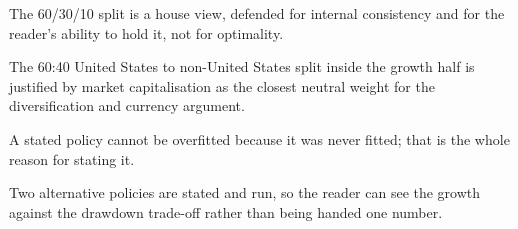 \begin{keytakeaways}
\item The 60/30/10 split is a house view, defended for internal
consistency and for the reader's ability to hold it, not for optimality.
\item The 60:40 United States to non-United States split inside the growth
half is justified by market capitalisation as the closest neutral weight
for the diversification and currency argument.
\item A stated policy cannot be overfitted because it was never fitted;
that is the whole reason for stating it.
\item Two alternative policies are stated and run, so the reader can see
the growth against the drawdown trade-off rather than being handed one
number.
\end{keytakeaways}
